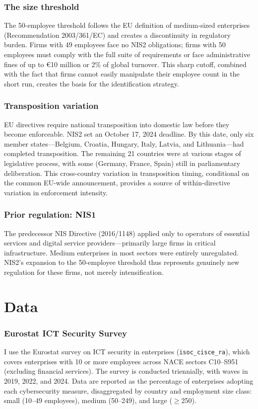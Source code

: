 \documentclass[12pt]{article}
\begin{document}
\subsubsection*{The size threshold} The 50-employee threshold follows the EU definition of medium-sized enterprises (Recommendation 2003/361/EC) and creates a discontinuity in regulatory burden. Firms with 49 employees face no NIS2 obligations; firms with 50 employees must comply with the full suite of requirements or face administrative fines of up to \euro{}10 million or 2\% of global turnover. This sharp cutoff, combined with the fact that firms cannot easily manipulate their employee count in the short run, creates the basis for the identification strategy.

\subsubsection*{Transposition variation} EU directives require national transposition into domestic law before they become enforceable. NIS2 set an October 17, 2024 deadline. By this date, only six member states---Belgium, Croatia, Hungary, Italy, Latvia, and Lithuania---had completed transposition. The remaining 21 countries were at various stages of legislative process, with some (Germany, France, Spain) still in parliamentary deliberation. This cross-country variation in transposition timing, conditional on the common EU-wide announcement, provides a source of within-directive variation in enforcement intensity.

\subsubsection*{Prior regulation: NIS1} The predecessor NIS Directive (2016/1148) applied only to operators of essential services and digital service providers---primarily large firms in critical infrastructure. Medium enterprises in most sectors were entirely unregulated. NIS2's expansion to the 50-employee threshold thus represents genuinely new regulation for these firms, not merely intensification.

\section{Data}

\subsubsection*{Eurostat ICT Security Survey} I use the Eurostat survey on ICT security in enterprises (\texttt{isoc\_cisce\_ra}), which covers enterprises with 10 or more employees across NACE sectors C10--S951 (excluding financial services). The survey is conducted triennially, with waves in 2019, 2022, and 2024. Data are reported as the percentage of enterprises adopting each cybersecurity measure, disaggregated by country and employment size class: small (10--49 employees), medium (50--249), and large ($\geq$250).
\end{document}
